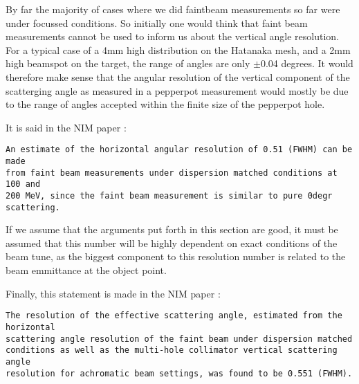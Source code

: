 \documentclass[11pt]{report}
\begin{document}
By far the majority of cases where we did faintbeam measurements so far were under focussed conditions. So initially one would 
think that faint beam measurements cannot be used to inform us about the vertical angle resolution.
For a typical case of a 4mm high distribution on the Hatanaka mesh, and a 2mm high beamspot on the target, the range of angles
are only $\pm$0.04 degrees.
It would therefore make sense that the angular resolution of the vertical component of the scatterging angle
as measured in a pepperpot measurement would mostly be due to the range of angles accepted within the finite size of
the pepperpot hole.
 




It is said in the NIM paper \cite{Nev11}:
\begin{verbatim} 
An estimate of the horizontal angular resolution of 0.51 (FWHM) can be made
from faint beam measurements under dispersion matched conditions at 100 and 
200 MeV, since the faint beam measurement is similar to pure 0degr scattering.
\end{verbatim} 

If we assume that the arguments put forth in this section are good, it must be assumed 
that this number will be highly dependent on exact conditions of the beam tune, as the biggest component
to this resolution number is related to the beam emmittance at the object point.

\noindent Finally, this statement is made in the NIM paper \cite{Nev11}:
\begin{verbatim} 
The resolution of the effective scattering angle, estimated from the horizontal 
scattering angle resolution of the faint beam under dispersion matched
conditions as well as the multi-hole collimator vertical scattering angle 
resolution for achromatic beam settings, was found to be 0.551 (FWHM). 
\end{verbatim} 
\end{document}
